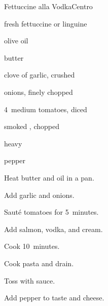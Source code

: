 \begin{recipe}{Fettuccine alla Vodka}{Centro}{}

\begin{ingredients}
\item {} fresh fettuccine or linguine
\item {} olive oil
\item {} butter
\item clove of garlic, crushed
\item {} onions, finely chopped
\item 4~medium tomatoes, diced
\item {} smoked , chopped
\item {} 
\item {} heavy 
\item pepper
\item \C{\quarter} 
\end{ingredients}

\begin{directions}
\item Heat butter and oil in a pan.
\item Add garlic and onions.
\item Saut\'e tomatoes for 5~minutes.
\item Add salmon, vodka, and cream.
\item Cook 10~minutes.
\item Cook pasta and drain.
\item Toss with sauce.
\item Add pepper to taste and cheese.
\end{directions}

\end{recipe}
